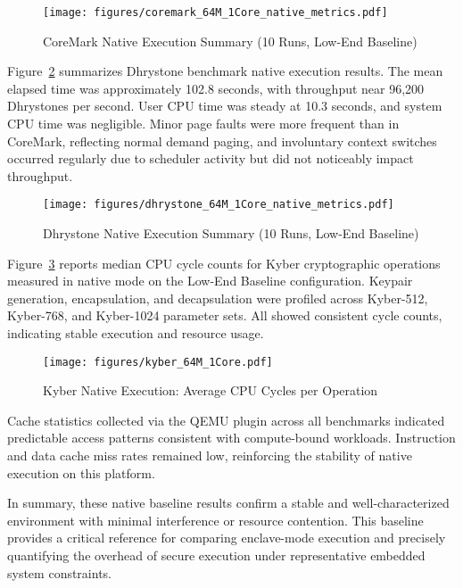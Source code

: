 \begin{figure}[h]
    \centering
    \texttt{[image: figures/coremark\_64M\_1Core\_native\_metrics.pdf]}
    \caption{CoreMark Native Execution Summary (10 Runs, Low-End Baseline)}
    \label{fig:coremark_native}
\end{figure}

Figure~\ref{fig:dhrystone_native} summarizes Dhrystone benchmark native execution results. The mean elapsed time was approximately 102.8 seconds, with throughput near 96,200 Dhrystones per second. User CPU time was steady at 10.3 seconds, and system CPU time was negligible. Minor page faults were more frequent than in CoreMark, reflecting normal demand paging, and involuntary context switches occurred regularly due to scheduler activity but did not noticeably impact throughput.

\begin{figure}[h]
    \centering
    \texttt{[image: figures/dhrystone\_64M\_1Core\_native\_metrics.pdf]}
    \caption{Dhrystone Native Execution Summary (10 Runs, Low-End Baseline)}
    \label{fig:dhrystone_native}
\end{figure}

Figure~\ref{fig:kyber_native_cycles} reports median CPU cycle counts for Kyber cryptographic operations measured in native mode on the Low-End Baseline configuration. Keypair generation, encapsulation, and decapsulation were profiled across Kyber-512, Kyber-768, and Kyber-1024 parameter sets. All showed consistent cycle counts, indicating stable execution and resource usage.

\begin{figure}[h]
    \centering
    \texttt{[image: figures/kyber\_64M\_1Core.pdf]}
    \caption{Kyber Native Execution: Average CPU Cycles per Operation}
    \label{fig:kyber_native_cycles}
\end{figure}

Cache statistics collected via the QEMU plugin across all benchmarks indicated predictable access patterns consistent with compute-bound workloads. Instruction and data cache miss rates remained low, reinforcing the stability of native execution on this platform.

In summary, these native baseline results confirm a stable and well-characterized environment with minimal interference or resource contention. This baseline provides a critical reference for comparing enclave-mode execution and precisely quantifying the overhead of secure execution under representative embedded system constraints.

